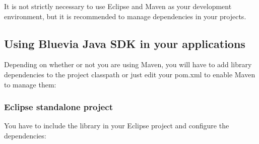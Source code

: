 It is not strictly necessary to use Eclipse and Maven as your development environment, but it is recommended to manage dependencies in your projects.\hypertarget{main_getting_started_library_sec}{}\subsection{Using Bluevia Java SDK in your applications}\label{main_getting_started_library_sec}
Depending on whether or not you are using Maven, you will have to add library dependencies to the project classpath or just edit your pom.xml to enable Maven to manage them:\hypertarget{main_getting_started_library_sec_eclipse}{}\subsubsection{Eclipse standalone project}\label{main_getting_started_library_sec_eclipse}
You have to include the library in your Eclipse project and configure the dependencies:


